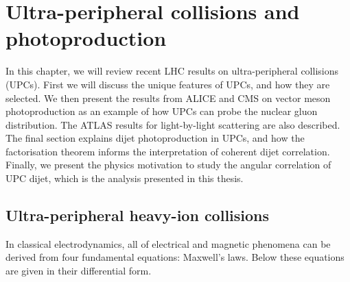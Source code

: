 \setlength\abovedisplayskip{0.4pt}
\setlength\belowdisplayskip{0.4pt}

\chapter{Ultra-peripheral collisions and photoproduction}

In this chapter, we will review recent LHC results on ultra-peripheral collisions (UPCs). First we will discuss the unique features of UPCs, and how they are selected. We then present the results from ALICE and CMS on vector meson photoproduction as an example of how UPCs can probe the nuclear gluon distribution. The ATLAS results for light-by-light scattering are also described. The final section explains dijet photoproduction in UPCs, and how the factorisation theorem informs the interpretation of coherent dijet correlation. Finally, we present the physics motivation to study the angular correlation of UPC dijet, which is the analysis presented in this thesis. 

\section{Ultra-peripheral heavy-ion collisions}

In classical electrodynamics, all of electrical and magnetic phenomena can be derived from four fundamental equations: Maxwell's laws. Below these equations are given in their differential form. 

